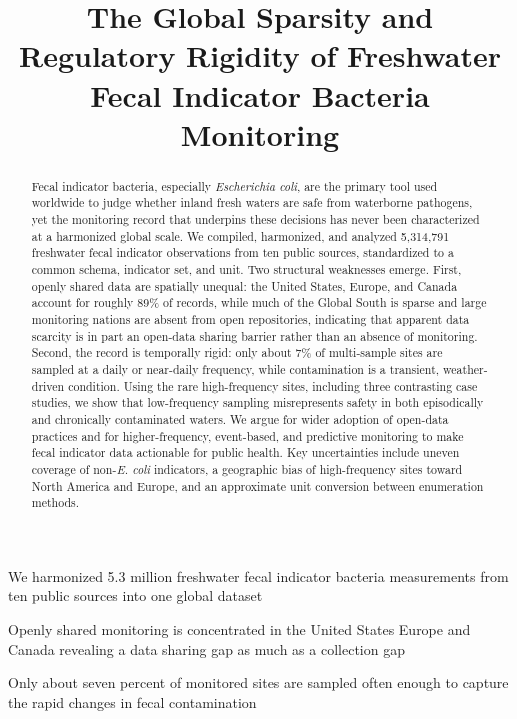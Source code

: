 \documentclass{agujournal2019}
\begin{document}
\title{The Global Sparsity and Regulatory Rigidity of Freshwater Fecal Indicator Bacteria Monitoring}




\begin{keypoints}
\item We harmonized 5.3 million freshwater fecal indicator bacteria measurements from ten public sources into one global dataset
\item Openly shared monitoring is concentrated in the United States Europe and Canada revealing a data sharing gap as much as a collection gap
\item Only about seven percent of monitored sites are sampled often enough to capture the rapid changes in fecal contamination
\end{keypoints}

\begin{abstract}
Fecal indicator bacteria, especially \textit{Escherichia coli}, are the primary tool used worldwide to judge whether inland fresh waters are safe from waterborne pathogens, yet the monitoring record that underpins these decisions has never been characterized at a harmonized global scale. We compiled, harmonized, and analyzed 5{,}314{,}791 freshwater fecal indicator observations from ten public sources, standardized to a common schema, indicator set, and unit. Two structural weaknesses emerge. First, openly shared data are spatially unequal: the United States, Europe, and Canada account for roughly 89\% of records, while much of the Global South is sparse and large monitoring nations are absent from open repositories, indicating that apparent data scarcity is in part an open-data sharing barrier rather than an absence of monitoring. Second, the record is temporally rigid: only about 7\% of multi-sample sites are sampled at a daily or near-daily frequency, while contamination is a transient, weather-driven condition. Using the rare high-frequency sites, including three contrasting case studies, we show that low-frequency sampling misrepresents safety in both episodically and chronically contaminated waters. We argue for wider adoption of open-data practices and for higher-frequency, event-based, and predictive monitoring to make fecal indicator data actionable for public health. Key uncertainties include uneven coverage of non-\textit{E. coli} indicators, a geographic bias of high-frequency sites toward North America and Europe, and an approximate unit conversion between enumeration methods.
\end{abstract}
\end{document}

